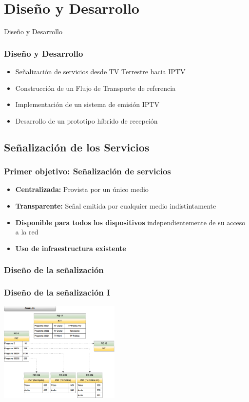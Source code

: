 \documentclass[a4paper,11pt]{beamer}
\begin{document}
\section{Diseño y Desarrollo}
\begin{frame}

\begin{center}
\Huge Diseño y Desarrollo
\end{center}

\end{frame}
	\begin{frame}
		\frametitle{Diseño y Desarrollo}
		\begin{itemize}
			\item Señalización de servicios desde TV Terrestre hacia IPTV
			\item Construcción de un Flujo de Transporte de referencia
			\item Implementación de un sistema de emisión IPTV
			\item Desarrollo de un prototipo híbrido de recepción
		\end{itemize}
	\end{frame}


	\subsection{Señalización de los Servicios}
	\begin{frame}
		\frametitle{Primer objetivo: Señalización de servicios}
		\begin{itemize}
			\item \textbf{Centralizada:} Provista por un único medio
			\item \textbf{Transparente:} Señal emitida por cualquier medio indistintamente
			\item \textbf{Disponible para todos los dispositivos} independientemente de su acceso a la red
			\item \textbf{Uso de infraestructura existente}
		\end{itemize}
	\end{frame}

		\subsubsection{Diseño de la señalización}
		\begin{frame}
			\frametitle{Diseño de la señalización I}
				\begin{center}
					\includegraphics[width=6cm]{canal_23_tables.png}
				\end{center}
		\end{frame}
\end{document}
